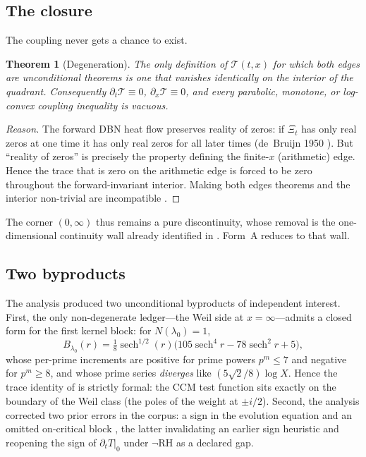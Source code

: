 \documentclass[11pt]{amsart}
\newtheorem{theorem}{Theorem}[section]
\theoremstyle{definition}
\theoremstyle{remark}
\newcommand{\RH}{\mathrm{RH}}
\begin{document}
\subsection{The closure}
The coupling never gets a chance to exist.

\begin{theorem}[Degeneration]\label{thm:formA-degeneration}
The only definition of $\mathcal{T}(t,x)$ for which \emph{both} edges are
unconditional theorems is one that vanishes identically on the interior of
the quadrant. Consequently $\partial_t\mathcal{T}\equiv0$,
$\partial_x\mathcal{T}\equiv0$, and every parabolic, monotone, or
log-convex coupling inequality is vacuous.
\end{theorem}

\begin{proof}[Reason]
The forward DBN heat flow preserves reality of zeros: if $\Xi_t$ has only
real zeros at one time it has only real zeros for all later times
(de~Bruijn 1950 \cite{deBruijn50}). But ``reality of zeros'' is precisely
the property defining the finite-$x$ (arithmetic) edge. Hence the trace
that is zero on the arithmetic edge is forced to be zero throughout the
forward-invariant interior. Making both edges theorems and the interior
non-trivial are incompatible \cite[Thm~3.2]{P40}.
\end{proof}

The corner $(0,\infty)$ thus remains a pure discontinuity, whose removal is
the one-dimensional continuity wall already identified in \cite[\S5.1]{P41}.
Form~A reduces to that wall.

\subsection{Two byproducts}
The analysis \cite[]{P40} produced two unconditional byproducts of
independent interest. First, the only non-degenerate ledger---the Weil side
at $x=\infty$---admits a closed form for the first kernel block:
for $N(\lambda_0)=1$,
\[
B_{\lambda_0}(r)=\tfrac18\operatorname{sech}^{1/2}(r)\bigl(105\operatorname{sech}^4 r-78\operatorname{sech}^2 r+5\bigr),
\]
whose per-prime increments are positive for prime powers $p^m\le7$ and
negative for $p^m\ge8$, and whose prime series \emph{diverges} like
$(5\sqrt2/8)\log X$. Hence the trace identity of \cite[Thm~4.1]{P40}
is strictly formal: the CCM test function sits exactly on the boundary of
the Weil class (the poles of the weight at $\pm i/2$). Second, the analysis
corrected two prior errors in the corpus: a sign in the evolution equation
\cite[]{P40} and an omitted on-critical block \cite[]{P40},
the latter invalidating an earlier sign heuristic and reopening the sign of
$\partial_t T|_{0}$ under $\neg\RH$ as a declared gap.
\end{document}
